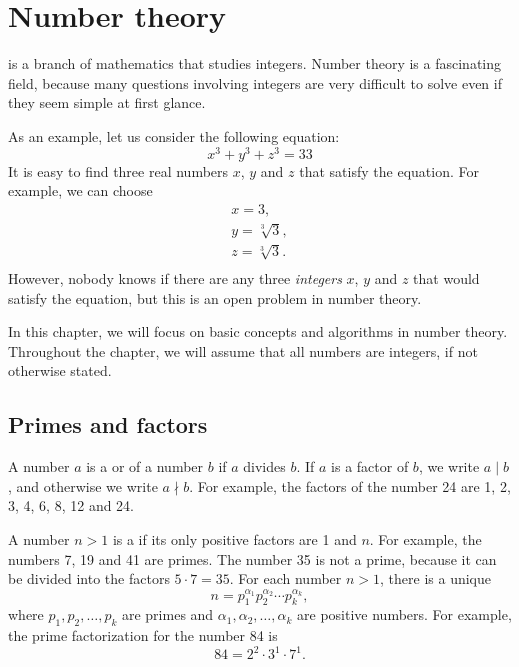 \chapter{Number theory}


 is a branch of mathematics
that studies integers.
Number theory is a fascinating field,
because many questions involving integers
are very difficult to solve even if they
seem simple at first glance.

As an example, let us consider the following equation:
\[x^3 + y^3 + z^3 = 33\]
It is easy to find three real numbers $x$, $y$ and $z$
that satisfy the equation.
For example, we can choose
\[
\begin{array}{lcl}
x = 3, \\
y = \sqrt[3]{3}, \\
z = \sqrt[3]{3}.\\
\end{array}
\]
However, nobody knows if there are any three
\emph{integers} $x$, $y$ and $z$
that would satisfy the equation, but this
is an open problem in number theory.

In this chapter, we will focus on basic concepts
and algorithms in number theory.
Throughout the chapter, we will assume that all numbers
are integers, if not otherwise stated.

\section{Primes and factors}


A number $a$ is a  or  of a number $b$
if $a$ divides $b$.
If $a$ is a factor of $b$,
we write $a \mid b$, and otherwise we write $a \nmid b$.
For example, the factors of the number 24 are
1, 2, 3, 4, 6, 8, 12 and 24.


A number $n>1$ is a 
if its only positive factors are 1 and $n$.
For example, the numbers 7, 19 and 41 are primes.
The number 35 is not a prime, because it can be
divided into the factors $5 \cdot 7 = 35$.
For each number $n>1$, there is a unique
\[ n = p_1^{\alpha_1} p_2^{\alpha_2} \cdots p_k^{\alpha_k},\]
where $p_1,p_2,\ldots,p_k$ are primes and
$\alpha_1,\alpha_2,\ldots,\alpha_k$ are positive numbers.
For example, the prime factorization for the number 84 is
\[84 = 2^2 \cdot 3^1 \cdot 7^1.\]

